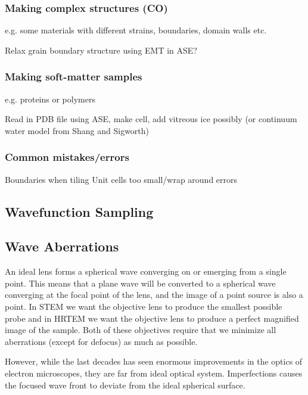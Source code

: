 \documentclass[%
 superscriptaddress,
 aip,
 amsmath,amssymb,
preprint,%
 author-year,%
longbibliography
]{revtex4-2}
\begin{document}
\subsubsection*{Making complex structures (CO)}
e.g. some materials with different strains, boundaries, domain walls etc. 

Relax grain boundary structure using EMT in ASE?





\subsubsection*{Making soft-matter samples}
e.g. proteins or polymers

Read in PDB file using ASE, make cell, add vitreous ice possibly (or continuum water model from Shang and Sigworth)



\subsubsection*{Common mistakes/errors}
Boundaries when tiling 
Unit cells too small/wrap around errors



\subsection*{Wavefunction Sampling}




\subsection*{Wave Aberrations}

An ideal lens forms a spherical wave converging on or emerging from a single point. This means that a plane wave will be converted to a spherical wave converging at the focal point of the lens, and the image of a point source is also a point. In STEM we want the objective lens to produce the smallest possible probe and in HRTEM we want the objective lens to produce a perfect magnified image of the sample. Both of these objectives require that we minimize all aberrations (except for defocus) as much as possible. 

However, while the last decades has seen enormous improvements in the optics of electron microscopes, they are far from ideal optical system. Imperfections causes the focused wave front to deviate from the ideal spherical surface. 
\end{document}
